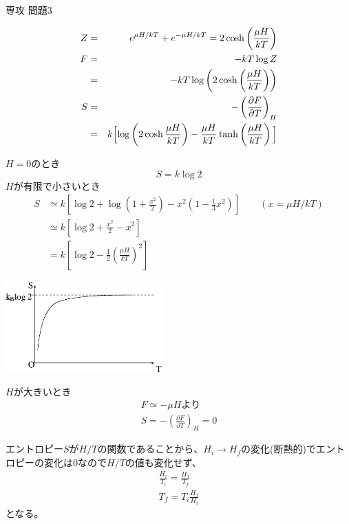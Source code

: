 \documentclass[fleqn]{jbook}
\begin{document}
\begin{answer}{専攻 問題3}

\begin{subanswers}
\SubAnswer
\begin{eqnarray*}
	 Z&=& e^{\mu H/kT}+e^{-\mu H/kT}=2 \cosh \left(\displaystyle\frac{\mu H}{kT}\right) \\
	F &=& -kT \log Z \\
	  &=& -kT \log \left(2\cosh \left(\displaystyle\frac{\mu H}{kT}\right)\right)\\
	S &=& {-\left(\displaystyle\frac{\partial F}{\partial T}\right)}_H \\
	  &=&  k \Bigl[  \log \left(2\cosh \displaystyle\frac{\mu H}{kT} \right)-\displaystyle\frac{\mu H}{kT} \tanh \left( \displaystyle\frac{\mu H}{kT} \right) \Bigl]
\end{eqnarray*} 
\SubAnswer
	\begin{subsubanswers}
	\SubSubAnswer
	$H=0$のとき　\[ S=k\log 2 \]
	\SubSubAnswer
	$H$が有限で小さいとき
		\begin{eqnarray*}
		S &\simeq  k \left[ \log 2 + \log \left( 1+\frac{x^2}{2} \right) -x^2 \left( 1-\frac{1}{3}x^2 \right) \right] \qquad  (x=\mu H/kT)\\
		&\simeq  k\left[ \log 2 + \frac{x^2}{2}-x^2 \right] \\
		&= k\left[ \log 2 -\frac{1}{2}\left( \frac{\mu H}{kT}\right)^2 \right]
		\end{eqnarray*}
		
		\begin{center}
			\includegraphics[clip,width=6cm]{1999phy3-0.eps}
		\end{center}
		
	\SubSubAnswer
	    $H$が大きいとき
		\begin{gather*}
		F \simeq -\mu Hより\\
		S = -\left( \frac{\partial F}{\partial T} \right)_H = 0
		\end{gather*}
	\end{subsubanswers}

\SubAnswer
    エントロピー$S$が$H/T$の関数であることから、$H_i \to H_f$の変化(断熱的)でエントロピーの変化は0なので$H/T$の値も変化せず、
    \begin{gather*}
	\frac{H_i}{T_i}=\frac{H_f}{T_f} \\
	T_f=T_i\frac{H_f}{H_i}
	\end{gather*}
	となる。


\end{subanswers}
\end{answer}
\end{document}
